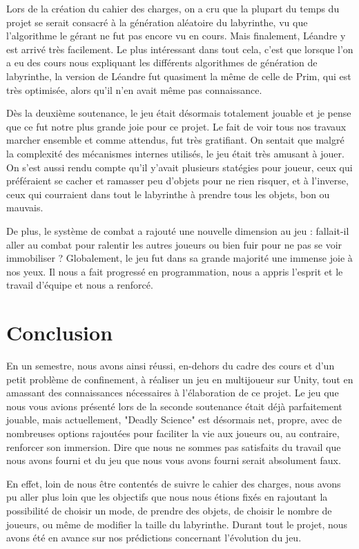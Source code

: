 \documentclass{article}
\begin{document}
Lors de la création du cahier des charges, on a cru que la plupart du temps du projet se serait consacré à la génération aléatoire du labyrinthe, vu que l'algorithme le gérant ne fut pas encore vu en cours. Mais finalement, Léandre y est arrivé très facilement. Le plus intéressant dans tout cela, c'est que lorsque l'on a eu des cours nous expliquant les différents algorithmes de génération de labyrinthe, la version de Léandre fut quasiment la même de celle de Prim, qui est très optimisée, alors qu'il n'en avait même pas connaissance. 

Dès la deuxième soutenance, le jeu était désormais totalement jouable et je pense que ce fut notre plus grande joie pour ce projet. Le fait de voir tous nos travaux marcher ensemble et comme attendus, fut très gratifiant. On sentait que malgré la complexité des mécanismes internes utilisés, le jeu était très amusant à jouer. On s'est aussi rendu compte qu'il y'avait plusieurs statégies pour joueur, ceux qui préféraient se cacher et ramasser peu d'objets pour ne rien risquer, et à l'inverse, ceux qui courraient dans tout le labyrinthe à prendre tous les objets, bon ou mauvais.

De plus, le système de combat a rajouté une nouvelle dimension au jeu : fallait-il aller au combat pour ralentir les autres joueurs ou bien fuir pour ne pas se voir immobiliser ? Globalement, le jeu fut dans sa grande majorité une immense joie à nos yeux. Il nous a fait progressé en programmation, nous a appris l'esprit et le travail d'équipe et nous a renforcé.

\newpage
\section{Conclusion}

En un semestre, nous avons ainsi réussi, en-dehors du cadre des cours et d'un petit problème de confinement, à réaliser un jeu en multijoueur sur Unity, tout en amassant des connaissances nécessaires à l'élaboration de ce projet. Le jeu que nous vous avions présenté lors de la seconde soutenance était déjà parfaitement jouable, mais actuellement, "Deadly Science" est désormais net, propre, avec de nombreuses options rajoutées pour faciliter la vie aux joueurs ou, au contraire, renforcer son immersion. Dire que nous ne sommes pas satisfaits du travail que nous avons fourni et du jeu que nous vous avons fourni serait absolument faux.

En effet, loin de nous être contentés de suivre le cahier des charges, nous avons pu aller plus loin que les objectifs que nous nous étions fixés en rajoutant la possibilité de choisir un mode, de prendre des objets, de choisir le nombre de joueurs, ou même de modifier la taille du labyrinthe. Durant tout le projet, nous avons été en avance sur nos prédictions concernant l'évolution du jeu.
\end{document}
